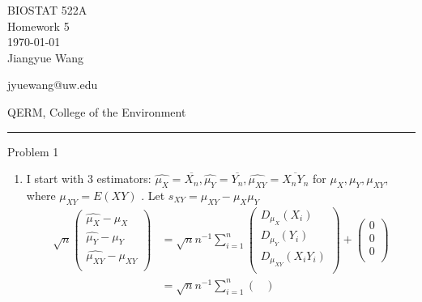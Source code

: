 \documentclass[12pt,letterpaper, onecolumn]{exam}
\begin{document}
\begingroup  
    \centering
    \LARGE BIOSTAT 522A\\
    \LARGE Homework 5\\[0.5em]
    \large \today\\[0.5em]
    \large Jiangyue Wang\par
    \large jyuewang@uw.edu\par
    \large QERM, College of the Environment\par
\endgroup
\rule{\textwidth}{0.4pt}
\pointsdroppedatright   %
\printanswers
\renewcommand{\solutiontitle}{\noindent\textbf{Ans:}\enspace}   %

\begin{questions}

    \question Problem 1
    \begin{solution}
        \begin{enumerate}
            \item I start with 3 estimators: $\hat{\mu_X} = \overline{X_n},\hat{\mu_Y} = \overline{Y_n}, \hat{\mu_{XY}} = \overline{X_nY_n}$ for $\mu_X, \mu_Y, \mu_{XY}$, where $\mu_{XY} = E(XY)$ . Let $s_{XY} = \mu_{XY} - \mu_X\mu_Y$ \\
            \begin{align*}
                \sqrt{n} \begin{pmatrix}
                    \hat{\mu_X} - \mu_X \\
                    \hat{\mu_Y} - \mu_Y \\
                    \hat{\mu_{XY}} - \mu_{XY} \\
                \end{pmatrix}  & = \sqrt{n}n^{-1}\sum_{i=1}^n \begin{pmatrix}
                    D_{\mu_X}(X_i) \\
                    D_{\mu_Y}(Y_i) \\
                    D_{\mu_{XY}}(X_iY_i) \\
                \end{pmatrix} + \begin{pmatrix}
                    0 \\
                    0 \\
                    0 \\
                \end{pmatrix} \\
                & = \sqrt{n}n^{-1}\sum_{i=1}^n \begin{pmatrix}

\end{pmatrix}
\end{align*}
\end{enumerate}
\end{solution}
\end{questions}
\end{document}
